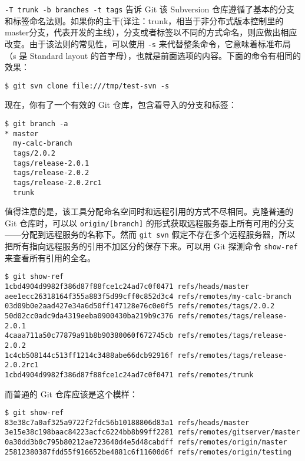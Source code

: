 \documentclass[a4paper]{book}
\begin{document}
\texttt{-T trunk -b branches -t tags} 告诉 Git 该 Subversion 仓库遵循了基本的分支和标签命名法则。如果你的主干(译注：trunk，相当于非分布式版本控制里的master分支，代表开发的主线），分支或者标签以不同的方式命名，则应做出相应改变。由于该法则的常见性，可以使用 \texttt{-s} 来代替整条命令，它意味着标准布局（s 是 Standard layout 的首字母），也就是前面选项的内容。下面的命令有相同的效果：

\begin{shaded}\begin{verbatim}
$ git svn clone file:///tmp/test-svn -s
\end{verbatim}\end{shaded}

现在，你有了一个有效的 Git 仓库，包含着导入的分支和标签：

\begin{shaded}\begin{verbatim}
$ git branch -a
* master
  my-calc-branch
  tags/2.0.2
  tags/release-2.0.1
  tags/release-2.0.2
  tags/release-2.0.2rc1
  trunk
\end{verbatim}\end{shaded}

值得注意的是，该工具分配命名空间时和远程引用的方式不尽相同。克隆普通的 Git 仓库时，可以以 \texttt{origin/{[}branch{]}} 的形式获取远程服务器上所有可用的分支------分配到远程服务的名称下。然而 \texttt{git svn} 假定不存在多个远程服务器，所以把所有指向远程服务的引用不加区分的保存下来。可以用 Git 探测命令 \texttt{show-ref} 来查看所有引用的全名。

\begin{shaded}\begin{verbatim}
$ git show-ref
1cbd4904d9982f386d87f88fce1c24ad7c0f0471 refs/heads/master
aee1ecc26318164f355a883f5d99cff0c852d3c4 refs/remotes/my-calc-branch
03d09b0e2aad427e34a6d50ff147128e76c0e0f5 refs/remotes/tags/2.0.2
50d02cc0adc9da4319eeba0900430ba219b9c376 refs/remotes/tags/release-2.0.1
4caaa711a50c77879a91b8b90380060f672745cb refs/remotes/tags/release-2.0.2
1c4cb508144c513ff1214c3488abe66dcb92916f refs/remotes/tags/release-2.0.2rc1
1cbd4904d9982f386d87f88fce1c24ad7c0f0471 refs/remotes/trunk
\end{verbatim}\end{shaded}

而普通的 Git 仓库应该是这个模样：

\begin{shaded}\begin{verbatim}
$ git show-ref
83e38c7a0af325a9722f2fdc56b10188806d83a1 refs/heads/master
3e15e38c198baac84223acfc6224bb8b99ff2281 refs/remotes/gitserver/master
0a30dd3b0c795b80212ae723640d4e5d48cabdff refs/remotes/origin/master
25812380387fdd55f916652be4881c6f11600d6f refs/remotes/origin/testing
\end{verbatim}\end{shaded}
\end{document}
